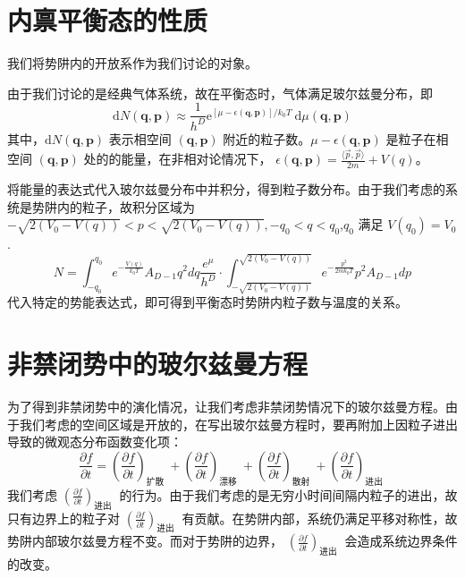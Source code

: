 \section{内禀平衡态的性质}
我们将势阱内的开放系作为我们讨论的对象。

由于我们讨论的是经典气体系统，故在平衡态时，气体满足玻尔兹曼分布，即
\begin{equation}\label{3.62}
  \mathrm{d} N(\boldsymbol{q}, \boldsymbol{p}) \approx \frac{1}{h^{D}} \mathrm{e}^{[\mu-\epsilon(\boldsymbol{q}, \boldsymbol{p})] / k_{0} T} \mathrm{~d} \mu(\boldsymbol{q}, \boldsymbol{p})
\end{equation}
其中，$\mathrm{d} N(\boldsymbol{q}, \boldsymbol{p})$  表示相空间  $(\boldsymbol{q}, \boldsymbol{p})$  附近的粒子数。$\mu-\epsilon(\boldsymbol{q}, \boldsymbol{p})$  是粒子在相空间  $(\boldsymbol{q}, \boldsymbol{p})$ 处的的能量，在非相对论情况下，  $\epsilon(\boldsymbol{q}, \boldsymbol{p})=\frac{\langle\vec{p}, \vec{p}\rangle}{2 m}+V(q)$。

将能量的表达式代入玻尔兹曼分布中并积分，得到粒子数分布。由于我们考虑的系统是势阱内的粒子，故积分区域为 $-\sqrt{2(V_{0}-V(q))}<p<\sqrt{2(V_{0}-V(q))},-q_{0}<q<q_{0}$,$q_{0}$  满足  $V(q_{0})=V_{0}$.
$$
N=\int_{-q_{0}}^{q_{0}} e^{-\frac{V(q)}{k_{0}T}}A_{D-1}q^{2} d q \frac{e^{\mu}}{h^{D}} \cdot \int_{-\sqrt{2\left(V_{0}-V(q)\right)}}^{\sqrt{2\left(V_{0}-V(q)\right)}} e^{-\frac{p^{2}}{2 m k_{0} T}} p^{2} A_{ D-1} dp
$$
代入特定的势能表达式，即可得到平衡态时势阱内粒子数与温度的关系。
\section{非禁闭势中的玻尔兹曼方程}
为了得到非禁闭势中的演化情况，让我们考虑非禁闭势情况下的玻尔兹曼方程。由于我们考虑的空间区域是开放的，在写出玻尔兹曼方程时，要再附加上因粒子进出导致的微观态分布函数变化项：
\begin{equation}
\frac{\partial f}{\partial t}=\left(\frac{\partial f}{\partial t}\right)_{\text {扩散 }}+\left(\frac{\partial f}{\partial t}\right)_{\text {漂移 }}+\left(\frac{\partial f}{\partial t}\right)_{\text {散射 }}+\left(\frac{\partial f}{\partial t}\right)_{\text {进出 }}
\end{equation}
我们考虑  $\left(\frac{\partial f}{\partial t}\right)_{\text {进出 }}$  的行为。由于我们考虑的是无穷小时间间隔内粒子的进出，故只有边界上的粒子对  $\left(\frac{\partial f}{\partial t}\right)_{\text {进出 }}$  有贡献。在势阱内部，系统仍满足平移对称性，故势阱内部玻尔兹曼方程不变。而对于势阱的边界，  $\left(\frac{\partial f}{\partial t}\right)_{\text {进出 }}$  会造成系统边界条件的改变。

